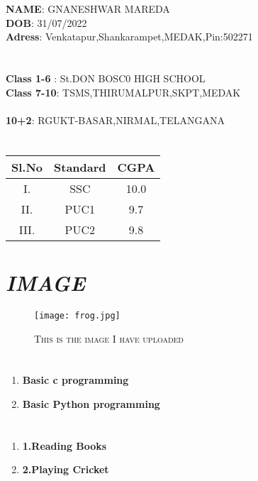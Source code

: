 \documentclass{article}
\title{\color{violet}{RESUME}}
\author{\color{black}\textbf{NAME: GNANESHWAR MAREDA}}
\date{2nd Aug 2022}
\begin{document}
\maketitle

\section*{\color{red}{1.PERSONAL DETAILS}}
\Large{\textbf{NAME}: GNANESHWAR MAREDA}\\
\Large{\textbf{DOB}: 31/07/2022}\\
\Large{\textbf{Adress}: Venkatapur,Shankarampet,MEDAK,Pin:502271}\\

\section*{\color{red}{2.EDUCATION DETAILS}}
\Large{\textbf{Class 1-6} : St.DON BOSC0 HIGH SCHOOL }
\\
\large{\textbf{Class 7-10}:   TSMS,THIRUMALPUR,SKPT,MEDAK }\\
\\
\large{\textbf{10+2}:       RGUKT-BASAR,NIRMAL,TELANGANA}\\
\section*{\color{red}{3.MARKS SHEET}}

\begin{table}[h]
\centering
\begin{tabular}{|c|c|c|}
\hline
\textbf{Sl.No} & \textbf{Standard}& \textbf{CGPA}\\
\hline
I. & SSC & 10.0\\
\hline 
II. & PUC1 & 9.7\\
\hline
III. & PUC2 & 9.8\\
\hline
\end{tabular}
\end{table}

\section*{\centering\color{red}\Large\textit{IMAGE}}
\begin{figure}
    \centering
    \texttt{[image: frog.jpg]}
    \caption{\label{fig:frog}\color{red}\textsc{This is the image I have uploaded}}
    \label{fig:FROG}
\end{figure}

\section*{\color{red}{5.SKILLS }}
\begin{enumerate}
   \item \textbf{Basic c programming}
 \item \textbf{Basic Python programming }
\end{enumerate}

\section*{\color{red}{6.HOBBIES}}
\begin{enumerate}
    \item \textbf{1.Reading Books}
    \item\textbf{2.Playing Cricket}
\end{enumerate}
\end{document}

